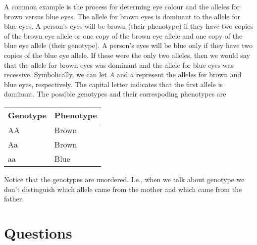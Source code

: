 \documentclass[addpoints,answers]{exam}
\begin{document}
A common example is the process for determing eye colour and the alleles for brown versus blue eyes. The allele for brown eyes is dominant to the allele for blue eyes. A person's eyes will be brown (their phenotype) if they have two copies of the brown eye allele or one copy of the brown eye allele and one copy of the blue eye allele (their genotype). A person's eyes will be blue only if they have two copies of the blue eye allele. If these were the only two alleles, then we would say that the allele for brown eyes was dominant and the allele for blue eyes was recessive. Symbolically, we can let $A$ and $a$ represent the alleles for brown and blue eyes, respectively. The capital letter indicates that the first allele is dominant. The possible genotypes and their correspoding phenotypes are
\begin{center}
  \begin{tabular}{ll}
    Genotype & Phenotype\\
    \hline
    AA & Brown\\
    Aa & Brown\\
    aa & Blue
  \end{tabular}
\end{center}
Notice that the genotypes are unordered. I.e., when we talk about genotype we don't distinguish which allele came from the mother and which came from the father. 

\newpage

\section{Questions}
\end{document}
